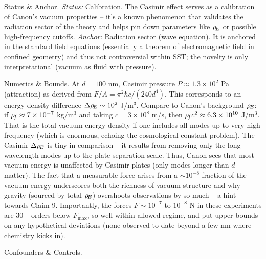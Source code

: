 \documentclass[11pt]{article}
\begin{document}
Status & Anchor. \textit{Status:} Calibration. The Casimir effect serves as a calibration of Canon’s vacuum properties – it’s a known phenomenon that validates the radiation sector of the theory and helps pin down parameters like $\rho_{\!E}$ or possible high-frequency cutoffs. \textit{Anchor:} Radiation sector (wave equation). It is anchored in the standard field equations (essentially a theorem of electromagnetic field in confined geometry) and thus not controversial within SST; the novelty is only interpretational (vacuum as fluid with pressure).


Numerics & Bounds. At $d=100$ nm, Casimir pressure $P \approx 1.3\times10^2$ Pa (attraction) as derived from $F/A = \pi^2 \hbar c/(240 d^4)$. This corresponds to an energy density difference $\Delta \rho_{\!E} \sim 10^2$ J/m$^3$. Compare to Canon’s background $\rho_{\!E}$: if $\rho_{\!f} \approx 7\times10^{-7}$ kg/m$^3$ and taking $c=3\times10^8$ m/s, then $\rho_{\!f} c^2 \approx 6.3\times10^{10}$ J/m$^3$. That is the total vacuum energy density if one includes all modes up to very high frequency (which is enormous, echoing the cosmological constant problem). The Casimir $\Delta \rho_{\!E}$ is tiny in comparison – it results from removing only the long wavelength modes up to the plate separation scale. Thus, Canon sees that most vacuum energy is unaffected by Casimir plates (only modes longer than $d$ matter). The fact that a measurable force arises from a $\sim10^{-8}$ fraction of the vacuum energy underscores both the richness of vacuum structure and why gravity (sourced by total $\rho_{\!E}$) overshoots observations by so much – a hint towards Claim 9. Importantly, the forces $F \sim 10^{-7}$ to $10^{-8}$ N in these experiments are 30+ orders below $F_{\max}$, so well within allowed regime, and put upper bounds on any hypothetical deviations (none observed to date beyond a few nm where chemistry kicks in).


Confounders & Controls.
\end{document}
